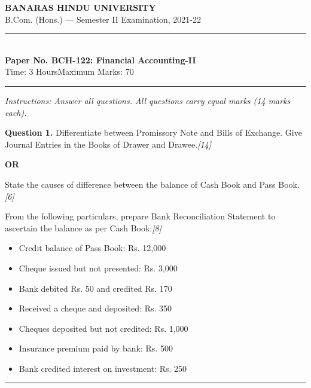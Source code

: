 \documentclass[11pt,a4paper]{article}
\newcommand{\pts}[1]{\hfill   \textit{[#1]}}
\begin{document}
\begin{center}
  {\large\bfseries BANARAS HINDU UNIVERSITY}\\[2pt]
  {\normalsize B.Com. (Hons.) --- Semester II Examination, 2021-22}\\[6pt]
  \rule{0.8\linewidth}{0.5pt}\\[6pt]
  {\large\bfseries Paper No. BCH-122: Financial Accounting-II}\\[4pt]
  {\normalsize Time: 3 Hours\hfill Maximum Marks: 70}
\end{center}

\rule{\linewidth}{0.4pt}

\smallskip



\noindent   \textit{Instructions: Answer all questions. All questions carry equal marks (14 marks each).}

\bigskip




\noindent   \textbf{Question 1.}
Differentiate between Promissory Note and Bills of Exchange. Give Journal Entries in the Books of Drawer and Drawee.\pts{14}

\centerline{   \textbf{OR}}


\begin{parts}
  \item State the causes of difference between the balance of Cash Book and Pass Book.\pts{6}
  \item From the following particulars, prepare Bank Reconciliation Statement to ascertain the balance as per Cash Book:\pts{8}
  
\begin{itemize}[itemsep=2pt,topsep=2pt]
    \item[(i)] Credit balance of Pass Book: Rs. 12,000
    \item[(ii)] Cheque issued but not presented: Rs. 3,000
    \item[(iii)] Bank debited Rs. 50 and credited Rs. 170
    \item[(iv)] Received a cheque and deposited: Rs. 350
    \item[(v)] Cheques deposited but not credited: Rs. 1,000
    \item[(vi)] Insurance premium paid by bank: Rs. 500
    \item[(vii)] Bank credited interest on investment: Rs. 250
  \end{itemize}
\end{parts}

\medskip\rule{\linewidth}{0.2pt}
\end{document}
